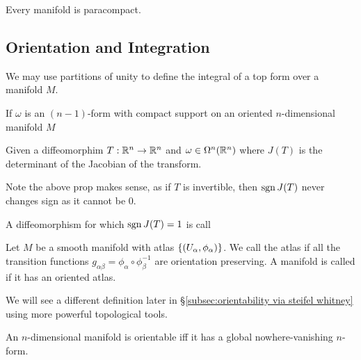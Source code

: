 \documentclass{article}
\begin{document}
\begin{prop}
	Every manifold is paracompact.
\end{prop}

\subsection{Orientation and Integration}

We may use partitions of unity to define the integral of a top form over a manifold $M$. 

\begin{theorem}
	If $\omega$ is an $(n-1)$-form with compact support on an oriented $n$-dimensional manifold $M$
\end{theorem}

\begin{prop}
	Given a diffeomorphim $T: \mathbb{R}^n \to \mathbb{R}^n$ and $\omega\in \Omega^n(\mathbb{R}^n)$ 
	where $J(T)$ is the determinant of the Jacobian of the transform. 
\end{prop}

\begin{remark}
	Note the above prop makes sense, as if $T$ is invertible, then $\operatorname{sgn} J(T)$ never changes sign as it cannot be 0. 
\end{remark}

\begin{definition}
	A diffeomorphism for which $\operatorname{sgn} J(T)=1$ is call 
\end{definition}

\begin{definition}
	Let $M$ be a smooth manifold with atlas $\left\{ (U_\alpha,\phi_\alpha) \right\}$. We call the atlas  if all the transition functions $g_{\alpha\beta}=\phi_\alpha \circ \phi_\beta^{-1}$ are orientation preserving. A manifold is called  if it has an oriented atlas. 
\end{definition}

\begin{remark}
 We will see a different definition later in \S\ref{subsec:orientability via steifel whitney} using more powerful topological tools. 
\end{remark}

\begin{prop}
	An $n$-dimensional manifold is orientable iff it has a global nowhere-vanishing $n$-form. 
\end{prop}
\end{document}
